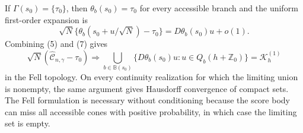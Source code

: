 If \(\Gamma(s_0)=\{\tau_0\}\), then \(\theta_b(s_0)=\tau_0\) for every accessible branch and the uniform first-order expansion is
\[
 \sqrt N\{\theta_b(s_0+u/\sqrt N)-\tau_0\}
 =D\theta_b(s_0)u+o(1).
 \tag{7}
\]
Combining (5) and (7) gives
\[
 \sqrt N(\widehat{\mathcal C}_{n,\gamma}-\tau_0)
 \Rightarrow
 \bigcup_{b\in\mathbb B(s_0)}
 \{D\theta_b(s_0)u:u\in Q_b(h+\mathbb Z_0)\}
 =\mathcal K_h^{(1)}
\]
in the Fell topology.  On every continuity realization for which the limiting union is nonempty, the same argument gives Hausdorff convergence of compact sets.  The Fell formulation is necessary without conditioning because the score body can miss all accessible cones with positive probability, in which case the limiting set is empty.